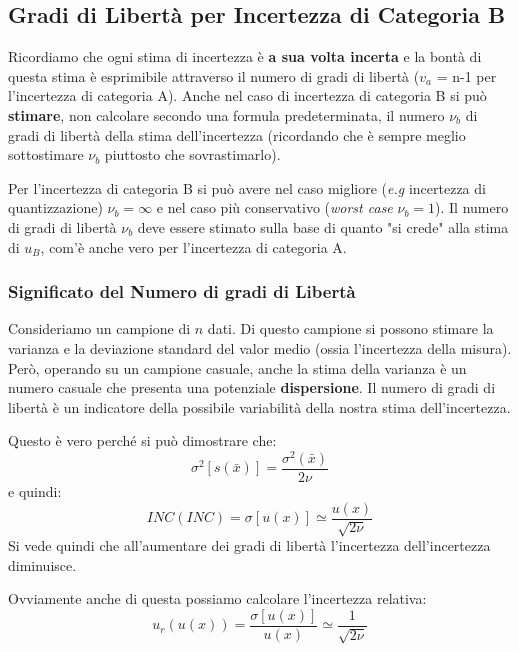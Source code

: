 \documentclass[a4paper,11pt]{report}
\begin{document}
\subsection{Gradi di Libertà per Incertezza di Categoria B}
Ricordiamo che ogni stima di incertezza è \textbf{a sua volta incerta} e la bontà di questa stima è esprimibile attraverso il numero di gradi di libertà ($v_a$ = n-1 per l'incertezza di categoria A).
Anche nel caso di incertezza di categoria B si può \textbf{stimare}, non calcolare secondo una formula predeterminata, il numero $\nu_b$ di gradi di libertà della stima dell'incertezza (ricordando che è sempre meglio sottostimare $\nu_b$ piuttosto che sovrastimarlo).

Per l'incertezza di categoria B si può avere nel caso migliore (\textit{e.g} incertezza di quantizzazione) $\nu_b = \infty$ e nel caso più conservativo (\textit{worst case} $\nu_b = 1$).
Il numero di gradi di libertà $\nu_b$ deve essere stimato sulla base di quanto "si crede" alla stima di $u_B$, com'è anche vero per l'incertezza di categoria A.

\subsubsection{Significato del Numero di gradi di Libertà}
Consideriamo un campione di $n$ dati. Di questo campione si possono stimare la varianza e la deviazione standard del valor medio (ossia l'incertezza della misura). Però, operando su un campione casuale, anche la stima della varianza è un numero casuale che presenta una potenziale \textbf{dispersione}. Il numero di gradi di libertà è un indicatore della possibile variabilità della nostra stima dell'incertezza.

Questo è vero perché si può dimostrare che:
$$
  \sigma^2[s(\bar{x})] = \frac{\sigma^2(\bar{x})}{2\nu}
$$
e quindi:
$$
  INC(INC) = \sigma[u(x)] \simeq \frac{u(x)}{\sqrt{2\nu}}
$$
Si vede quindi che all'aumentare dei gradi di libertà l'incertezza dell'incertezza diminuisce.

Ovviamente anche di questa possiamo calcolare l'incertezza relativa:
$$
  u_r(u(x)) = \frac{\sigma[u(x)]}{u(x)} \simeq \frac{1}{\sqrt{2\nu}}
$$
\end{document}
